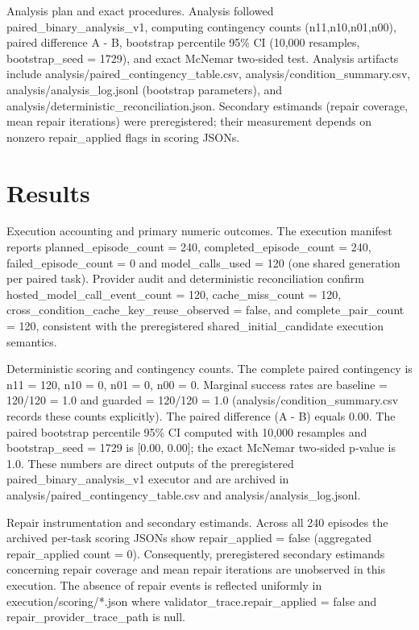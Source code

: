 \documentclass[conference]{IEEEtran}
\begin{document}
Analysis plan and exact procedures. Analysis followed paired\_binary\_analysis\_v1, computing contingency counts (n11,n10,n01,n00), paired difference A - B, bootstrap percentile 95\% CI (10,000 resamples, bootstrap\_seed = 1729), and exact McNemar two‑sided test. Analysis artifacts include analysis/paired\_contingency\_table.csv, analysis/condition\_summary.csv, analysis/analysis\_log.jsonl (bootstrap parameters), and analysis/deterministic\_reconciliation.json. Secondary estimands (repair coverage, mean repair iterations) were preregistered; their measurement depends on nonzero repair\_applied flags in scoring JSONs.

\section{Results}
Execution accounting and primary numeric outcomes. The execution manifest reports planned\_episode\_count = 240, completed\_episode\_count = 240, failed\_episode\_count = 0 and model\_calls\_used = 120 (one shared generation per paired task). Provider audit and deterministic reconciliation confirm hosted\_model\_call\_event\_count = 120, cache\_miss\_count = 120, cross\_condition\_cache\_key\_reuse\_observed = false, and complete\_pair\_count = 120, consistent with the preregistered shared\_initial\_candidate execution semantics.

Deterministic scoring and contingency counts. The complete paired contingency is n11 = 120, n10 = 0, n01 = 0, n00 = 0. Marginal success rates are baseline = 120/120 = 1.0 and guarded = 120/120 = 1.0 (analysis/condition\_summary.csv records these counts explicitly). The paired difference (A - B) equals 0.00. The paired bootstrap percentile 95\% CI computed with 10,000 resamples and bootstrap\_seed = 1729 is [0.00, 0.00]; the exact McNemar two‑sided p‑value is 1.0. These numbers are direct outputs of the preregistered paired\_binary\_analysis\_v1 executor and are archived in analysis/paired\_contingency\_table.csv and analysis/analysis\_log.jsonl.

Repair instrumentation and secondary estimands. Across all 240 episodes the archived per‑task scoring JSONs show repair\_applied = false (aggregated repair\_applied count = 0). Consequently, preregistered secondary estimands concerning repair coverage and mean repair iterations are unobserved in this execution. The absence of repair events is reflected uniformly in execution/scoring/*.json where validator\_trace.repair\_applied = false and repair\_provider\_trace\_path is null.
\end{document}
